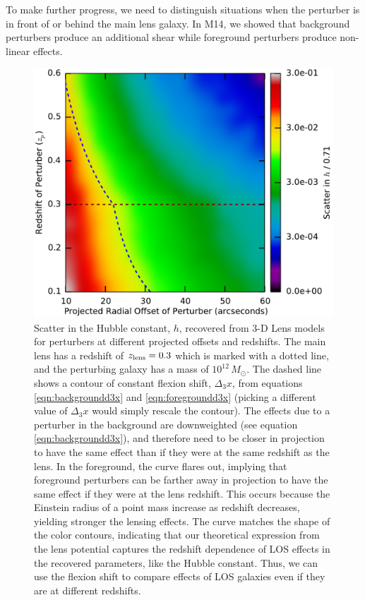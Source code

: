 \documentclass{emulateapj}
\begin{document}
To make further progress, we need to distinguish situations when the perturber is in front of or behind the main lens galaxy. In M14, we showed that background perturbers produce an additional shear while foreground perturbers produce non-linear effects.

\begin{figure}[t]
\begin{center}
\includegraphics[width=\columnwidth]{toyh.pdf}
\caption{\label{fig:toyhd3x} Scatter in the Hubble constant, $h$, recovered from 3-D Lens models for perturbers at different projected offsets and redshifts.  The main lens has a redshift of $z_{\rm{lens}} = 0.3$ which is marked with a dotted line, and the perturbing galaxy has a mass of $10^{12}\,M_\odot$.  The dashed line shows a contour of constant flexion shift, $\Delta_3 x$, from equations \ref{eqn:backgroundd3x} and \ref{eqn:foregroundd3x} (picking a different value of $\Delta_3 x$ would simply rescale the contour). The effects due to a perturber in the background are downweighted (see equation \ref{eqn:backgroundd3x}), and therefore need to be closer in projection to have the same effect than if they were at the same redshift as the lens. In the foreground, the curve flares out, implying that foreground perturbers can be farther away in projection to have the same effect if they were at the lens redshift. This occurs because the Einstein radius of a point mass increase as redshift decreases, yielding stronger the lensing effects. The curve matches the shape of the color contours, indicating that our theoretical expression from the lens potential captures the redshift dependence of LOS effects in the recovered parameters, like the Hubble constant.  Thus, we can use the flexion shift to compare effects of LOS galaxies even if they are at different redshifts.
}
\end{center}
\end{figure}
\end{document}

